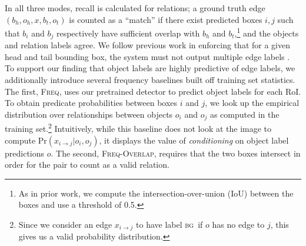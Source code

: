 \documentclass[10pt,twocolumn,letterpaper]{article}
\newcommand{\bg}{\textsc{bg}}  %
\begin{document}
In all three modes, recall is calculated for relations; a ground truth edge $(b_h, o_h, x, b_t, o_t)$ is counted as a ``match'' if there exist predicted boxes $i,j$ such that $b_i$ and $b_j$ respectively have sufficient overlap with $b_h$ and $b_t$,\footnote{As in prior work, we compute the intersection-over-union (IoU) between the boxes and use a threshold of 0.5.} and the objects and relation labels agree.
We follow previous work in enforcing that for a given head and tail bounding box, the system must not output multiple edge labels \cite{xu_scene_2017, lu_visual_2016}.
To support our finding that object labels are highly predictive of edge labels, we additionally introduce several frequency baselines built off training set statistics. The first, \textsc{Freq}, uses our pretrained detector to predict object labels for each RoI. To obtain predicate probabilities between boxes $i$ and $j$, we look up the empirical distribution over relationships between objects $o_i$ and $o_j$ as computed in the training set.\footnote{Since we consider an edge $x_{i \to j}$ to have label \bg\ if $o$ has no edge to $j$, this gives us a valid probability distribution.} Intuitively, while this baseline does not look at the image to compute $\textrm{Pr}(x_{i\to j} | o_i, o_j)$, it displays the value of \emph{conditioning} on object label predictions $o$. The second, \textsc{Freq-Overlap}, requires that the two boxes intersect in order for the pair to count as a valid relation.
\end{document}
